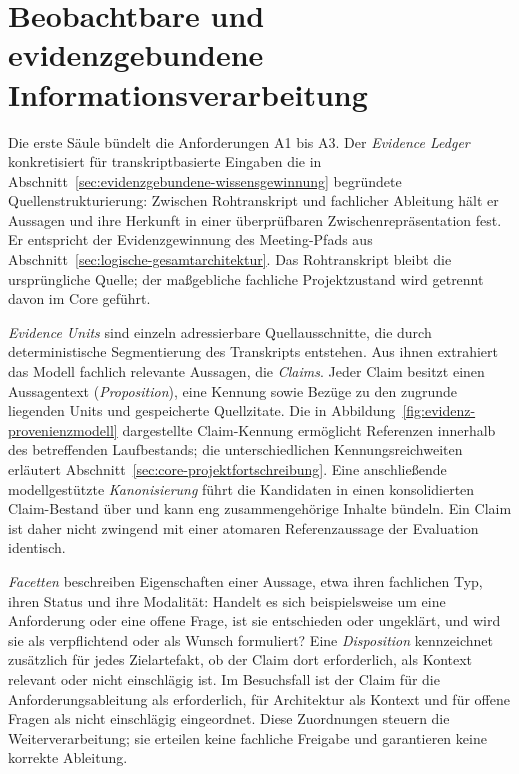 
\section{Beobachtbare und evidenzgebundene Informationsverarbeitung}
\label{sec:evidenzgebundene-verarbeitung}

Die erste Säule bündelt die Anforderungen A1 bis A3. Der
\emph{Evidence Ledger} konkretisiert für transkriptbasierte Eingaben
die in Abschnitt~\ref{sec:evidenzgebundene-wissensgewinnung}
begründete Quellenstrukturierung: Zwischen Rohtranskript und
fachlicher Ableitung hält er Aussagen und ihre Herkunft in einer
überprüfbaren Zwischenrepräsentation fest. Er entspricht der
Evidenzgewinnung des Meeting-Pfads aus
Abschnitt~\ref{sec:logische-gesamtarchitektur}. Das Rohtranskript
bleibt die ursprüngliche Quelle; der maßgebliche fachliche
Projektzustand wird getrennt davon im Core geführt.

\emph{Evidence Units} sind einzeln adressierbare Quellausschnitte,
die durch deterministische Segmentierung des Transkripts entstehen.
Aus ihnen extrahiert das Modell fachlich relevante Aussagen, die
\emph{Claims}. Jeder Claim besitzt einen Aussagentext
(\emph{Proposition}), eine Kennung sowie Bezüge zu den
zugrunde liegenden Units und gespeicherte Quellzitate. Die in
Abbildung~\ref{fig:evidenz-provenienzmodell} dargestellte
Claim-Kennung ermöglicht Referenzen innerhalb des betreffenden Laufbestands;
die unterschiedlichen Kennungsreichweiten erläutert
Abschnitt~\ref{sec:core-projektfortschreibung}.
Eine anschließende modellgestützte \emph{Kanonisierung} führt die
Kandidaten in einen konsolidierten Claim-Bestand über und kann eng
zusammengehörige Inhalte bündeln. Ein Claim ist daher nicht zwingend
mit einer atomaren Referenzaussage der Evaluation identisch.

\emph{Facetten} beschreiben Eigenschaften einer Aussage, etwa ihren
fachlichen Typ, ihren Status und ihre Modalität: Handelt es sich
beispielsweise um eine Anforderung oder eine offene Frage, ist sie
entschieden oder ungeklärt, und wird sie als verpflichtend oder als
Wunsch formuliert? Eine \emph{Disposition} kennzeichnet zusätzlich
für jedes Zielartefakt, ob der Claim dort erforderlich, als Kontext
relevant oder nicht einschlägig ist. Im Besuchsfall ist der Claim
für die Anforderungsableitung als erforderlich, für Architektur als
Kontext und für offene Fragen als nicht einschlägig eingeordnet.
Diese Zuordnungen steuern die Weiterverarbeitung; sie erteilen keine
fachliche Freigabe und garantieren keine korrekte Ableitung.

